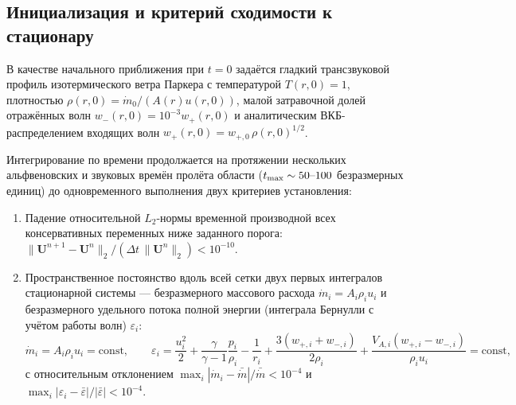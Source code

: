 \documentclass[11pt,a4paper]{article}
\begin{document}
\subsection{Инициализация и критерий сходимости к стационару}

В качестве начального приближения при $t = 0$ задаётся гладкий трансзвуковой профиль изотермического ветра Паркера с температурой $T(r,0) = 1$, плотностью $\rho(r,0) = \dot{m}_0 / (A(r)u(r,0))$, малой затравочной долей отражённых волн $w_-(r,0) = 10^{-3}w_+(r,0)$ и аналитическим ВКБ-распределением входящих волн $w_+(r,0) = w_{+,0}\,\rho(r,0)^{1/2}$.

Интегрирование по времени продолжается на протяжении нескольких альфвеновских и звуковых времён пролёта области ($t_{\rm max} \sim 50\text{--}100$ безразмерных единиц) до одновременного выполнения двух критериев установления:
\begin{enumerate}
\item Падение относительной $L_2$-нормы временной производной всех консервативных переменных ниже заданного порога: $\|\bm{U}^{n+1} - \bm{U}^n\|_2 / (\Delta t\,\|\bm{U}^n\|_2) < 10^{-10}$.
\item Пространственное постоянство вдоль всей сетки двух первых интегралов стационарной системы --- безразмерного массового расхода $\dot{m}_i = A_i\rho_i u_i$ и безразмерного удельного потока полной энергии (интеграла Бернулли с учётом работы волн) $\varepsilon_i$:
\begin{equation}
\dot{m}_i = A_i\rho_i u_i = \mathrm{const}, \qquad
\varepsilon_i = \frac{u_i^2}{2} + \frac{\gamma}{\gamma-1}\frac{p_i}{\rho_i} - \frac{1}{r_i} + \frac{3(w_{+,i} + w_{-,i})}{2\rho_i} + \frac{V_{A,i}(w_{+,i} - w_{-,i})}{\rho_i u_i} = \mathrm{const},
\label{eq:stationary_integrals_check}
\end{equation}
с относительным отклонением $\max_i |\dot{m}_i - \bar{\dot{m}}|/\bar{\dot{m}} < 10^{-4}$ и $\max_i |\varepsilon_i - \bar{\varepsilon}|/|\bar{\varepsilon}| < 10^{-4}$.
\end{enumerate}
\end{document}
